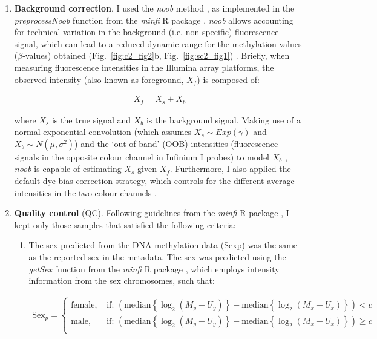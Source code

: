 \begin{enumerate}
	
	
	\item \textbf{Background correction}. I used the \textit{noob} method \citep{TricheJr2013}, as implemented in the \textit{preprocessNoob} function from the \textit{minfi} R package \citep{Aryee2014}. \textit{noob} allows accounting for technical variation in the background (i.e. non-specific) fluorescence signal, which can lead to a reduced dynamic range for the methylation values ($\beta$-values) obtained (Fig.~\ref{fig:c2_fig2}b, Fig.~\ref{fig:sc2_fig1}) \citep{TricheJr2013}. Briefly, when measuring fluorescence intensities in the Illumina array platforms, the observed intensity (also known as foreground, $X_f$) is composed of:
	
	\begin{align}
	X_f = X_s + X_b
	\end{align}
	
	where $X_s$ is the true signal and $X_b$ is the background signal. Making use of a normal-exponential convolution (which assumes $X_s\sim Exp(\gamma)$ and $X_b\sim N(\mu, \sigma^2)$) and the `out-of-band' (\acrshort{OOB}) intensities (fluorescence signals in the opposite colour channel in Infinium I probes) to model $X_b$ , \textit{noob} is capable of estimating $X_s$ given $X_f$. Furthermore, I also applied the default dye-bias correction strategy, which controls for the different average intensities in the two colour channels \citep{TricheJr2013}. 
	
		\item \textbf{Quality control} (QC). Following guidelines from the \textit{minfi} R package \citep{Aryee2014}, I kept only those samples that satisfied the following criteria:
		
		\begin{enumerate}
			
			\item The sex predicted from the DNA methylation data (\acrshort{Sexp}) was the same as the reported sex in the metadata. The sex was predicted  using the \textit{getSex} function from the \textit{minfi} R package \citep{Aryee2014}, which employs intensity information from the sex chromosomes, such that:
			
			\begin{align}
			\text{Sex}_{p} = 
			\begin{cases}
			\text{female, } &\text{if: } (\mathrm{median}\left\{\log_2(M_{y}+U_{y})\right\} -  \mathrm{median}\left\{\log_2(M_{x}+U_{x})\right\}) < c \\
			\text{male, } &\text{if: } (\mathrm{median}\left\{\log_2(M_{y}+U_{y})\right\} -  \mathrm{median}\left\{\log_2(M_{x}+U_{x})\right\}) \geq c \\
			\end{cases}
			\end{align}
			

\end{enumerate}
\end{enumerate}
